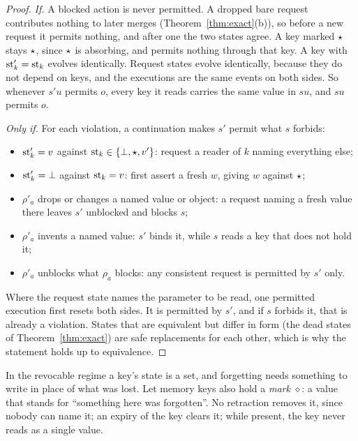 \begin{proof}
\emph{If.} A blocked action is never permitted. A dropped bare request contributes nothing to later
merges (Theorem~\ref{thm:exact}(b)), so before a new request it permits nothing, and after one the
two states agree. A key marked $\star$ stays $\star$, since $\star$ is absorbing, and
permits nothing through that key. A key with $\mathrm{st}'_k = \mathrm{st}_k$ evolves identically. Request states
evolve identically, because they do not depend on keys, and the executions are the same events on
both sides. So whenever $s'u$ permits $o$, every key it reads carries the same value in $su$, and
$su$ permits $o$.

\emph{Only if.} For each violation, a continuation makes $s'$ permit what $s$ forbids:
\begin{itemize}
\item $\mathrm{st}'_k = v$ against $\mathrm{st}_k \in \{\bot, \star, v'\}$: request a reader of $k$ naming
  everything else;
\item $\mathrm{st}'_k = \bot$ against $\mathrm{st}_k = v$: first assert a fresh $w$, giving $w$ against $\star$;
\item $\rho'_a$ drops or changes a named value or object: a request naming a fresh value there
  leaves $s'$ unblocked and blocks $s$;
\item $\rho'_a$ invents a named value: $s'$ binds it, while $s$ reads a key that does not hold it;
\item $\rho'_a$ unblocks what $\rho_a$ blocks: any consistent request is permitted by $s'$ only.
\end{itemize}
Where the request state names the parameter to be read, one permitted execution first resets
both sides. It is permitted by $s'$, and if $s$ forbids it, that is already a violation. States
that are equivalent but differ in form (the dead states of Theorem~\ref{thm:exact}) are safe
replacements for each other, which is why the statement holds up to equivalence.
\end{proof}

In the revocable regime a key's state is a set, and forgetting needs something to write in place
of what was lost. Let memory keys also hold a \emph{mark} $\diamond$: a value that stands for
``something here was forgotten''. No retraction removes it, since nobody can name it; an expiry of
the key clears it; while present, the key never reads as a single value.

